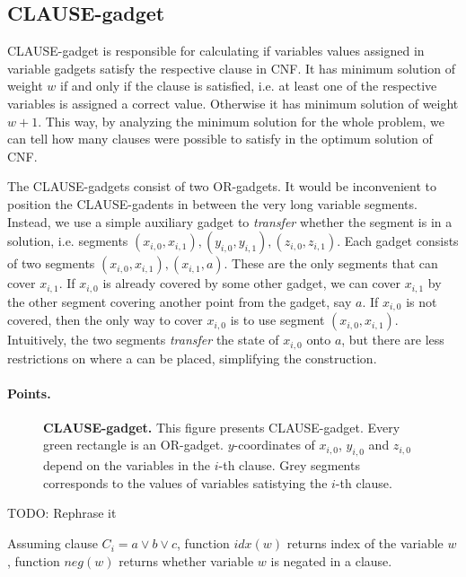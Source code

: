 \subsection{CLAUSE-gadget}


CLAUSE-gadget is responsible for calculating if
variables values assigned in variable gadgets
satisfy the respective clause in CNF.
It has minimum solution of weight $w$
if and only if the clause is satisfied, i.e. at least one
of the respective variables is assigned a correct value.
Otherwise it has minimum solution of weight $w+1$.
This way, by analyzing the minimum solution for the whole problem,
we can tell how many clauses were possible to satisfy
in the optimum solution of CNF.

The CLAUSE-gadgets consist of two OR-gadgets.
It would be inconvenient to position the CLAUSE-gadents
in between the very long variable segments.
Instead, we use a simple auxiliary gadget to
\textit{transfer} whether the segment
is in a solution, i.e. segments
$(x_{i, 0}, x_{i, 1}), (y_{i, 0}, y_{i, 1}), (z_{i, 0}, z_{i, 1})$.
Each gadget consists of two segments $(x_{i, 0}, x_{i, 1}), (x_{i, 1}, a)$.
These are the only segments that can cover $x_{i,1}$.
If $x_{i,0}$ is already covered by some other gadget,
we can cover $x_{i,1}$ by the other segment covering another point
from the gadget, say $a$.
If $x_{i,0}$ is not covered, then the only way to cover $x_{i,0}$
is to use segment $(x_{i, 0}, x_{i, 1})$.
Intuitively, the two segments \textit{transfer} the state of $x_{i,0}$
onto $a$, but there are less restrictions on where a can be placed,
simplifying the construction.

\paragraph{Points.}

\newcommand{\pointsClause}{\mathsf{pointsClause}}

\begin{figure}[h]
\centering
\def\svgwidth{0.8\columnwidth}

\caption{\textbf{CLAUSE-gadget.}
This figure presents CLAUSE-gadget.
Every green rectangle is an OR-gadget.
$y$-coordinates of $x_{i, 0}$, $y_{i, 0}$ and $z_{i,0}$
depend on the variables in the $i$-th clause.
Grey segments corresponds to the values of variables
satistying the $i$-th clause.
}
\label{fig:apx_clause}
\end{figure}

TODO: Rephrase it

Assuming clause $C_i = a \lor b \lor c$,
function $idx(w)$ returns index of the variable $w$,
function $neg(w)$ returns whether variable $w$ is negated
in a clause.

